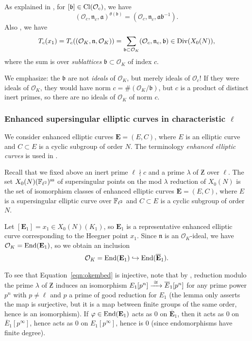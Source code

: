 \documentclass{article} \usepackage[active]{srcltx}
\newcommand{\Oc}{\mathcal{O}_c}
\newcommand{\eE}{\mathbf{E}}
\newcommand{\Felltwo}{\F_{\ell^2}}
\newcommand{\Eonebar}{\overline{\eE}_1}
\newcommand{\OK}{\mathcal{O}_K}
\newcommand{\n}{\mathfrak{n}}
\renewcommand{\O}{\mathcal{O}}
\DeclareMathOperator{\supersingular}{ss}
\renewcommand{\ss}{\supersingular}
\begin{document}
\newcommand{\fa}{\mathfrak{a}} 
\newcommand{\fb}{\mathfrak{b}}
\newcommand{\fg}{\mathfrak{g}}

As explained in \cite[\S4, (4.2)]{gross:heegnerX0N}, for $[\fb]\in \Cl(\Oc)$, we have
$$
  (\Oc,\n_c,\fa)^{\theta(\fb)} = (\Oc,\n_c,\fa\fb^{-1}).
$$
Also \cite[\S6]{gross:heegnerX0N}, we have
\begin{equation}\label{eqn:heckeop}
 T_c(x_1) = T_c((\OK,\n,\OK)) = \sum_{\fb\subset \OK} (\Oc,\n_c,\fb)
\in \Div(X_0(N)),
\end{equation}
where the sum is over {\em sublattices} $\fb \subset \OK$ of index $c$.
\begin{remark} We emphasize: the $\fb$ are not {\em ideals} of $\OK$,
  but merely ideals of $\Oc$!  If they were ideals of $\OK$, they
  would have norm $c=\#(\OK/\fb)$, but $c$ is a product of distinct
  inert primes, so there are no ideals of $\OK$ of norm $c$.
\end{remark}

\subsubsection{Enhanced supersingular elliptic curves in characteristic $\ell$}\label{sec:enhancedcurves}

We consider enhanced elliptic curves $\eE = (E,C)$, where $E$ is
an elliptic curve and $C\subset E$ is a cyclic subgroup of order $N$.
The terminology {\em enhanced elliptic curves} is used in
\cite[\S3]{ribet:modreps}.

Recall that we fixed above an inert prime $\ell\nmid c$ and a prime
$\lambda$ of $\Zbar$ over $\ell$.  The set
$X_0(N)(\Felltwo)^{\ss}$ of supersingular points on the mod $\lambda$
reduction of $X_0(N)$ is the set of isomorphism classes of enhanced
elliptic curves $\eE = (E,C)$, where $E$ is a supersingular elliptic
curve over $\Felltwo$ and $C\subset E$ is a cyclic subgroup of order
$N$.


Let $[\eE_1] = x_1 \in X_0(N)(K_1)$, so $\eE_1$ is a representative
enhanced elliptic curve corresponding to the Heegner point $x_1$.
Since $\n$ is an $\O_K$-ideal, we have $\OK = \End(\eE_1)$, so we
obtain an inclusion
\begin{equation}\label{eqn:okembed} \OK = \End(\eE_1)
\hra \End(\Eonebar).
\end{equation} 

\begin{remark}\label{rmk:rediso}
  To see that Equation~\eqref{eqn:okembed} is injective, note that by
  \cite[Lem.~2]{serre-tate}, reduction modulo the prime $\lambda$ of
  $\Zbar$ induces an isomorphism 
$E_1[p^{n}]\xrightarrow{\,\,\cong\,\,} \overline{E}_1[p^{n}]$ for any prime power $p^n$ with $p\neq \ell$
  and $p$ a prime of good reduction for $E_1$ (the lemma only asserts
  the map is surjective, but it is a map between finite groups of the
  same order, hence is an isomorphism).  If $\vphi \in \End(\eE_1)$
  acts as $0$ on $\Eonebar$, then it acts as $0$ on
  $\overline{E}_1[p^{\infty}]$, hence acts as 0 on $E_1[p^{\infty}]$,
  hence is 0 (since endomorphisms have finite degree). 
\end{remark}
\end{document}

